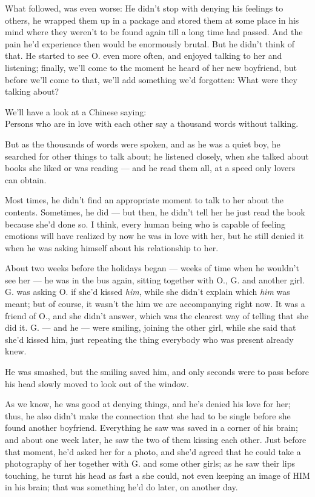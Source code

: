 What followed, was even worse: He didn't stop with denying his feelings to others, he wrapped them up in a package and stored them at some place in his mind where they weren't to be found again till a long time had passed. 
And the pain he'd experience then would be enormously brutal. 
But he didn't think of that. 
He started to see O. even more often, and enjoyed talking to her and listening; finally, we'll come to the moment he heard of her new boyfriend, but before we'll come to that, we'll add something we'd forgotten: What were they talking about?

We'll have a look at a Chinese saying:\\
Persons who are in love with each other say a thousand words without talking.

But as the thousands of words were spoken, and as he was a quiet boy, he searched for other things to talk about; he listened closely, when she talked about books she liked or was reading --- and he read them all, at a speed only lovers can obtain.

Most times, he didn't find an appropriate moment to talk to her about the contents. 
Sometimes, he did --- but then, he didn't tell her he just read the book because she'd done so. 
I think, every human being who is capable of feeling emotions will have realized by now he was in love with her, but he still denied it when he was asking himself about his relationship to her.

About two weeks before the holidays began --- weeks of time when he wouldn't see her --- he was in the bus again, sitting together with O., G. and another girl. G. was asking O. if she'd kissed \emph{him}, while she didn't explain which \emph{him} was meant; but of course, it wasn't the him we are accompanying right now. It was a friend of O., and she didn't answer, which was the clearest way of telling that she did it. G. --- and he --- were smiling, joining the other girl, while she said that she'd kissed him, just repeating the thing everybody who was present already knew.

He was smashed, but the smiling saved him, and only seconds were to pass before his head slowly moved to look out of the window.

As we know, he was good at denying things, and he's denied his love for her; thus, he also didn't make the connection that she had to be single before she found another boyfriend. Everything he saw was saved in a corner of his brain; and about one week later, he saw the two of them kissing each other. Just before that moment, he'd asked her for a photo, and she'd agreed that he could take a photography of her together with G. and some other girls; as he saw their lips touching, he turnt his head as fast a she could, not even keeping an image of HIM in his brain; that was something he'd do later, on another day.

